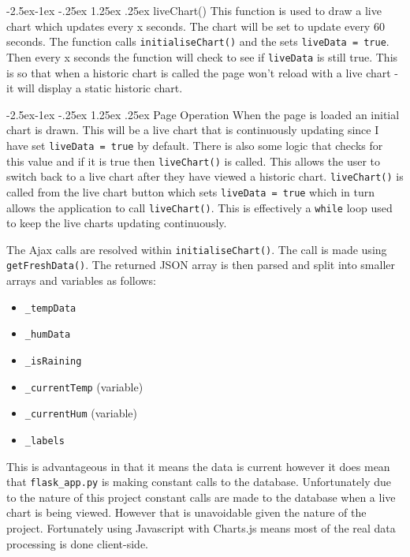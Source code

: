 \documentclass[10pt,a4paper]{article}
\makeatletter
\renewcommand\paragraph{\@startsection{paragraph}{4}{\z@}%
            {-2.5ex\@plus -1ex \@minus -.25ex}%
            {1.25ex \@plus .25ex}%
            {\normalfont\normalsize\bfseries}}
\makeatother
\begin{document}
\paragraph{liveChart()}
This function is used to draw a live chart which updates every x seconds. The chart will be set to update every 60 seconds. The function calls \texttt{initialiseChart()} and the sets \texttt{liveData = true}. Then every x seconds the function will check to see if \texttt{liveData} is still true. This is so that when a historic chart is called the page won't reload with a live chart - it will display a static historic chart. 

\paragraph{Page Operation}
When the page is loaded an initial chart is drawn. This will be a live chart that is continuously updating since I have set \texttt{liveData = true} by default. There is also some logic that checks for this value and if it is true then \texttt{liveChart()} is called. This allows the user to switch back to a live chart after they have viewed a historic chart. \texttt{liveChart()} is called from the live chart button which sets \texttt{liveData = true} which in turn allows the application to call \texttt{liveChart()}. This is effectively a \texttt{while} loop used to keep the live charts updating continuously. 

The Ajax calls are resolved within \texttt{initialiseChart()}. The call is made using \texttt{getFreshData()}. The returned JSON array is then parsed and split into smaller arrays and variables as follows: 
\begin{itemize}
\item \texttt{\_tempData}
\item \texttt{\_humData}
\item \texttt{\_isRaining}
\item \texttt{\_currentTemp} (variable)
\item \texttt{\_currentHum} (variable)
\item \texttt{\_labels}
\end{itemize}

This is advantageous in that it means the data is current however it does mean that \texttt{flask\_app.py} is making constant calls to the database. Unfortunately due to the nature of this project constant calls are made to the database when a live chart is being viewed. However that is unavoidable given the nature of the project. Fortunately using Javascript with Charts.js means most of the real data processing is done client-side. 
\end{document}
